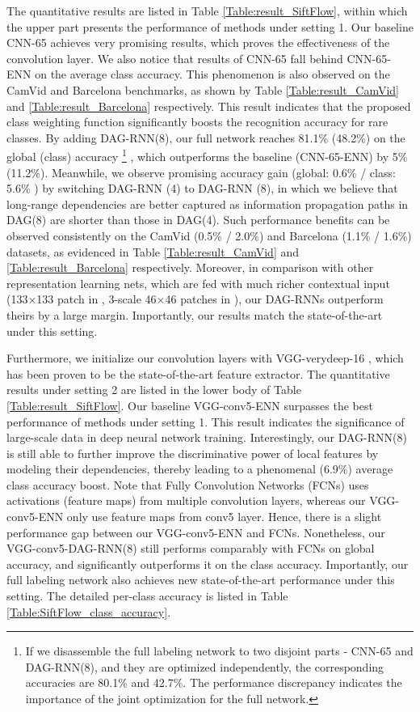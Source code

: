 \documentclass[10pt,twocolumn,letterpaper]{article}
\begin{document}
The quantitative results are listed in Table \ref{Table:result_SiftFlow}, within which the upper part presents the performance of methods under setting 1.
Our baseline CNN-65 achieves very promising results, which proves the effectiveness of the convolution layer. We also notice that results of CNN-65 fall behind CNN-65-ENN on the average class accuracy. This phenomenon is also observed on the CamVid and Barcelona benchmarks, as shown by Table \ref{Table:result_CamVid} and \ref{Table:result_Barcelona} respectively.
This result indicates that the proposed class weighting function significantly boosts the recognition accuracy for rare classes.
By adding DAG-RNN(8), our full network reaches 81.1\% (48.2\%) on the global (class) accuracy
\footnote{If we disassemble the full labeling network to two disjoint parts - CNN-65 and DAG-RNN(8), and they are optimized independently, the corresponding accuracies are 80.1\% and 42.7\%. The performance discrepancy indicates the importance of the joint optimization for the full network.}
, which outperforms the baseline (CNN-65-ENN) by 5\% (11.2\%). Meanwhile, we observe promising accuracy gain (global: 0.6\% / class: 5.6\% ) by switching DAG-RNN (4) to DAG-RNN (8), in which we believe that long-range dependencies are better captured as information propagation paths in DAG(8) are shorter than those in DAG(4). Such performance benefits can be observed consistently on the CamVid (0.5\% / 2.0\%) and Barcelona (1.1\% / 1.6\%) datasets, as evidenced in Table \ref{Table:result_CamVid} and \ref{Table:result_Barcelona} respectively. Moreover, in comparison with other representation learning nets, which are fed with much richer contextual input (133$\times$133 patch in \cite{pinheiro2014recurrent}, 3-scale 46$\times$46 patches in \cite{farabet2013learning}), our DAG-RNNs outperform theirs by a large margin.  Importantly, our results match the state-of-the-art under this setting.

Furthermore, we initialize our convolution layers with VGG-verydeep-16 \cite{simonyan2014very}, which has been proven to be the state-of-the-art feature extractor. The quantitative results under setting 2 are listed in the lower body of Table \ref{Table:result_SiftFlow}. Our baseline VGG-conv5-ENN surpasses the best performance of methods under setting 1. This result indicates the significance of large-scale data in deep neural network training. Interestingly, our DAG-RNN(8) is still able to further improve the discriminative power of local features by modeling their dependencies, thereby leading to a phenomenal (6.9\%) average class accuracy boost. Note that Fully Convolution Networks (FCNs) \cite{long2015fully} uses activations (feature maps) from multiple convolution layers, whereas our VGG-conv5-ENN only use feature maps from conv5 layer. Hence, there is a slight performance gap between our VGG-conv5-ENN and FCNs. Nonetheless, our VGG-conv5-DAG-RNN(8) still performs comparably with FCNs on global accuracy, and significantly outperforms it on the class accuracy. Importantly, our full labeling network also achieves new state-of-the-art performance under this setting. The detailed per-class accuracy is listed in Table \ref{Table:SiftFlow_class_accuracy}.
\end{document}
